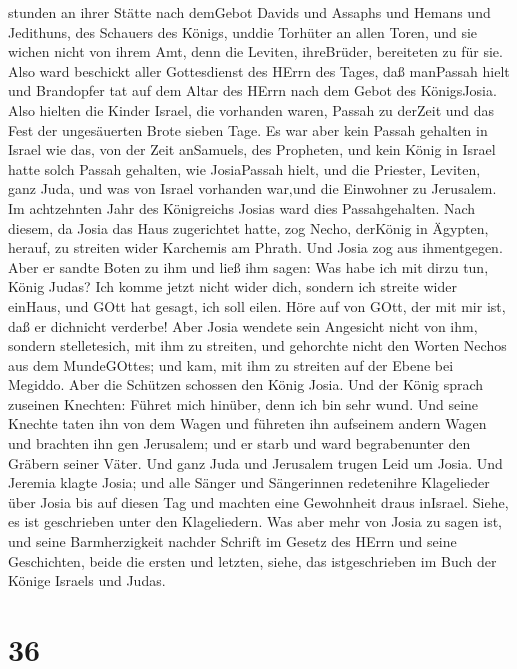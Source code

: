 stunden an ihrer Stätte nach demGebot Davids und Assaphs und Hemans und
Jedithuns, des Schauers des Königs, unddie Torhüter an allen Toren, und
sie wichen nicht von ihrem Amt, denn die Leviten, ihreBrüder, bereiteten
zu für sie.  Also ward beschickt aller Gottesdienst des
HErrn des Tages, daß manPassah hielt und Brandopfer tat auf dem Altar
des HErrn nach dem Gebot des KönigsJosia.  Also hielten die
Kinder Israel, die vorhanden waren, Passah zu derZeit und das Fest der
ungesäuerten Brote sieben Tage.  Es war aber kein Passah
gehalten in Israel wie das, von der Zeit anSamuels, des Propheten, und
kein König in Israel hatte solch Passah gehalten, wie JosiaPassah hielt,
und die Priester, Leviten, ganz Juda, und was von Israel vorhanden
war,und die Einwohner zu Jerusalem.  Im achtzehnten Jahr
des Königreichs Josias ward dies Passahgehalten.  Nach
diesem, da Josia das Haus zugerichtet hatte, zog Necho, derKönig in
Ägypten, herauf, zu streiten wider Karchemis am Phrath. Und Josia zog
aus ihmentgegen.  Aber er sandte Boten zu ihm und ließ ihm
sagen: Was habe ich mit dirzu tun, König Judas? Ich komme jetzt nicht
wider dich, sondern ich streite wider einHaus, und GOtt hat gesagt, ich
soll eilen. Höre auf von GOtt, der mit mir ist, daß er dichnicht
verderbe!  Aber Josia wendete sein Angesicht nicht von ihm,
sondern stelletesich, mit ihm zu streiten, und gehorchte nicht den
Worten Nechos aus dem MundeGOttes; und kam, mit ihm zu streiten auf der
Ebene bei Megiddo.  Aber die Schützen schossen den König
Josia. Und der König sprach zuseinen Knechten: Führet mich hinüber, denn
ich bin sehr wund.  Und seine Knechte taten ihn von dem
Wagen und führeten ihn aufseinem andern Wagen und brachten ihn gen
Jerusalem; und er starb und ward begrabenunter den Gräbern seiner Väter.
Und ganz Juda und Jerusalem trugen Leid um Josia.  Und
Jeremia klagte Josia; und alle Sänger und Sängerinnen redetenihre
Klagelieder über Josia bis auf diesen Tag und machten eine Gewohnheit
draus inIsrael. Siehe, es ist geschrieben unter den Klageliedern.
 Was aber mehr von Josia zu sagen ist, und seine
Barmherzigkeit nachder Schrift im Gesetz des HErrn  und
seine Geschichten, beide die ersten und letzten, siehe, das
istgeschrieben im Buch der Könige Israels und Judas.

\hypertarget{section-35}{%
\section{36}\label{section-35}}

